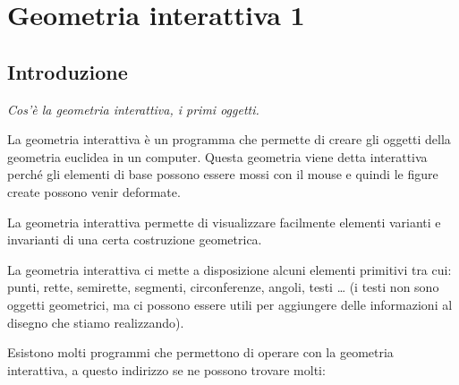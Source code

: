 
\begin{comment}


\end{comment}

\lstset{numbers=left, numberstyle=\tiny, frame=trbl, frameround=ftff,
        language=Python}

\chapter{Geometria interattiva 1}

\section{Introduzione}
\label{sec:introduzione}

\emph{Cos'è la geometria interattiva, i primi oggetti.}

La geometria interattiva è un programma che permette di creare gli oggetti 
della geometria euclidea in un computer.
Questa geometria viene detta interattiva perché gli elementi di base possono 
essere mossi con il mouse e quindi le figure create possono venir deformate.

La geometria interattiva permette di visualizzare facilmente elementi
varianti e invarianti di una certa costruzione geometrica.

La geometria interattiva ci mette a disposizione alcuni elementi primitivi tra 
cui: punti, rette, semirette, segmenti, circonferenze, angoli, testi \dots
(i testi non sono oggetti geometrici, ma ci possono essere utili per aggiungere 
delle informazioni al disegno che stiamo realizzando).


Esistono molti programmi che permettono di operare con la geometria
interattiva, a questo indirizzo se ne possono trovare molti:

